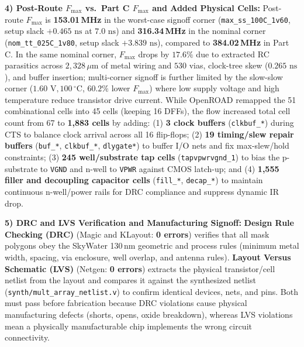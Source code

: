\documentclass[conference,10pt]{IEEEtran}
\begin{document}
\textbf{4) Post-Route $F_{\max}$ vs.\ Part C $F_{\max}$ and Added Physical Cells:}
Post-route $F_{\max}$ is \textbf{153.01\,MHz} in the worst-case signoff corner (\texttt{max\_ss\_100C\_1v60}, setup slack $+0.465\text{ ns}$ at $7.0\text{ ns}$) and \textbf{316.34\,MHz} in the nominal corner (\texttt{nom\_tt\_025C\_1v80}, setup slack $+3.839\text{ ns}$), compared to \textbf{384.02\,MHz} in Part C. In the same nominal corner, $F_{\max}$ drops by $17.6\%$ due to extracted RC parasitics across $2,328\,\mu\text{m}$ of metal wiring and $530$ vias, clock-tree skew ($0.265\text{ ns}$), and buffer insertion; multi-corner signoff is further limited by the slow-slow corner ($1.60\text{ V}, 100\,^\circ\text{C}$, $60.2\%$ lower $F_{\max}$) where low supply voltage and high temperature reduce transistor drive current. While OpenROAD remapped the 51 combinational cells into 45 cells (keeping 16 DFFs), the flow increased total cell count from 67 to \textbf{1,883 cells} by adding: (1) \textbf{3 clock buffers} (\texttt{clkbuf\_*}) during CTS to balance clock arrival across all 16 flip-flops; (2) \textbf{19 timing/slew repair buffers} (\texttt{buf\_*}, \texttt{clkbuf\_*}, \texttt{dlygate*}) to buffer I/O nets and fix max-slew/hold constraints; (3) \textbf{245 well/substrate tap cells} (\texttt{tapvpwrvgnd\_1}) to bias the p-substrate to \texttt{VGND} and n-well to \texttt{VPWR} against CMOS latch-up; and (4) \textbf{1,555 filler and decoupling capacitor cells} (\texttt{fill\_*}, \texttt{decap\_*}) to maintain continuous n-well/power rails for DRC compliance and suppress dynamic IR drop.

\textbf{5) DRC and LVS Verification and Manufacturing Signoff:}
\textbf{Design Rule Checking (DRC)} (Magic and KLayout: \textbf{0 errors}) verifies that all mask polygons obey the SkyWater 130\,nm geometric and process rules (minimum metal width, spacing, via enclosure, well overlap, and antenna rules). \textbf{Layout Versus Schematic (LVS)} (Netgen: \textbf{0 errors}) extracts the physical transistor/cell netlist from the layout and compares it against the synthesized netlist (\texttt{synth/mult\_array\_netlist.v}) to confirm identical devices, nets, and pins. Both must pass before fabrication because DRC violations cause physical manufacturing defects (shorts, opens, oxide breakdown), whereas LVS violations mean a physically manufacturable chip implements the wrong circuit connectivity.
\end{document}
